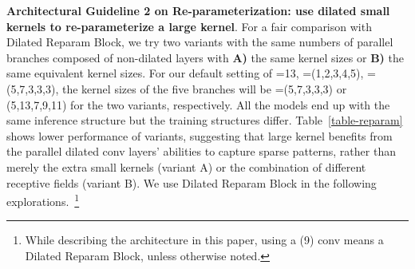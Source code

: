 \documentclass[10pt,twocolumn,letterpaper]{article}
\begin{document}
	\begin{table}
		\caption{Models with different efficient extra structures to increase the depth. We report the ImageNet accuracy (Acc), ADE20K mIoU, and actual throughput (Img/s).}
		\label{table-guide1}
		\vspace{-0.2in}
		\begin{center}
		\end{center}
		\vspace{-0.2in}
	\end{table}

\noindent\textbf{Architectural Guideline 2 on Re-parameterization: use dilated small kernels to re-parameterize a large kernel}. For a fair comparison with Dilated Reparam Block, we try two variants with the same numbers of parallel branches composed of non-dilated layers with \textbf{A)} the same kernel sizes or \textbf{B)} the same equivalent kernel sizes. For our default setting of =13, =(1,2,3,4,5), =(5,7,3,3,3), the kernel sizes of the five branches will be =(5,7,3,3,3) or (5,13,7,9,11) for the two variants, respectively. All the models end up with the same inference structure but the training structures differ. Table~\ref{table-reparam} shows lower performance of variants, suggesting that large kernel benefits from the parallel dilated conv layers' abilities to capture sparse patterns, rather than merely the extra small kernels (variant A) or the combination of different receptive fields (variant B). We use Dilated Reparam Block in the following explorations.~\footnote{While describing the architecture in this paper, using a  (9) conv means a  Dilated Reparam Block, unless otherwise noted.}
\end{document}
